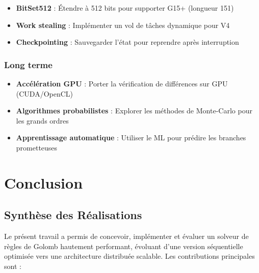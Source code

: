 \documentclass[12pt,a4paper,twoside]{report}
\begin{document}
\begin{itemize}
    \item \textbf{BitSet512} : Étendre à 512 bits pour supporter G15+ (longueur 151)
    \item \textbf{Work stealing} : Implémenter un vol de tâches dynamique pour V4
    \item \textbf{Checkpointing} : Sauvegarder l'état pour reprendre après interruption
\end{itemize}

\subsection{Long terme}

\begin{itemize}
    \item \textbf{Accélération GPU} : Porter la vérification de différences sur GPU (CUDA/OpenCL)
    \item \textbf{Algorithmes probabilistes} : Explorer les méthodes de Monte-Carlo pour les grands ordres
    \item \textbf{Apprentissage automatique} : Utiliser le ML pour prédire les branches prometteuses
\end{itemize}


\chapter{Conclusion}

\section{Synthèse des Réalisations}

Le présent travail a permis de concevoir, implémenter et évaluer un solveur de règles de Golomb hautement performant, évoluant d'une version séquentielle optimisée vers une architecture distribuée scalable. Les contributions principales sont :
\end{document}
